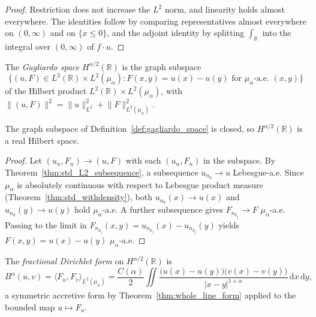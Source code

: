 \begin{proof}
\leanok
Restriction does not increase the $L^2$ norm, and linearity holds almost everywhere. The identities follow by comparing representatives almost everywhere on $(0, \infty)$ and on $\{x \le 0\}$, and the adjoint identity by splitting $\int_{\mathbb{R}}$ into the integral over $(0, \infty)$ of $f \cdot u$.
\end{proof}

\begin{definition}\label{def:gagliardo_space}
\leanok
The \emph{Gagliardo space} $H^{\alpha/2}(\mathbb{R})$ is the graph subspace
\[
  \{ (u, F) \in L^2(\mathbb{R}) \times L^2(\mu_\alpha) : F(x, y) = u(x) - u(y) \text{ for } \mu_\alpha\text{-a.e. } (x, y) \}
\]
of the Hilbert product $L^2(\mathbb{R}) \times L^2(\mu_\alpha)$, with $\lVert (u, F) \rVert^2 = \lVert u \rVert_{L^2}^2 + \lVert F \rVert_{L^2(\mu_\alpha)}^2$.
\end{definition}

\begin{lemma}\label{lem:gagliardo_space_closed}
\leanok
The graph subspace of Definition~\ref{def:gagliardo_space} is closed, so $H^{\alpha/2}(\mathbb{R})$ is a real Hilbert space.
\end{lemma}

\begin{proof}
\leanok
Let $(u_n, F_n) \to (u, F)$ with each $(u_n, F_n)$ in the subspace. By Theorem~\ref{thm:std_L2_subsequence}, a subsequence $u_{n_k} \to u$ Lebesgue-a.e. Since $\mu_\alpha$ is absolutely continuous with respect to Lebesgue product measure (Theorem~\ref{thm:std_withdensity}), both $u_{n_k}(x) \to u(x)$ and $u_{n_k}(y) \to u(y)$ hold $\mu_\alpha$-a.e. A further subsequence gives $F_{n_{k_j}} \to F$ $\mu_\alpha$-a.e. Passing to the limit in $F_{n_{k_j}}(x, y) = u_{n_{k_j}}(x) - u_{n_{k_j}}(y)$ yields $F(x, y) = u(x) - u(y)$ $\mu_\alpha$-a.e.
\end{proof}

\begin{definition}\label{def:gagliardo_form}
\leanok
The \emph{fractional Dirichlet form} on $H^{\alpha/2}(\mathbb{R})$ is
\[
  B^\alpha(u, v) = \langle F_u, F_v \rangle_{L^2(\mu_\alpha)} = \frac{C(\alpha)}{2} \iint \frac{\bigl(u(x) - u(y)\bigr)\bigl(v(x) - v(y)\bigr)}{\lvert x - y \rvert^{1 + \alpha}} \, \mathrm{d}x \, \mathrm{d}y,
\]
a symmetric accretive form by Theorem~\ref{thm:whole_line_form} applied to the bounded map $u \mapsto F_u$.
\end{definition}


